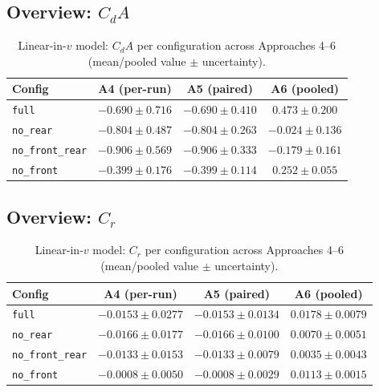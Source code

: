 \documentclass[11pt,a4paper]{article}
\begin{document}
\subsection{Overview: \(C_dA\)}
\begin{table}[h]
  \centering
  \small
  \caption{Linear-in-\(v\) model: \(C_dA\) per configuration across Approaches 4--6 (mean/pooled value $\pm$ uncertainty).}
  \label{tab:linear-cda}
  \begin{tabular}{lccc}
    \toprule
    Config & A4 (per-run) & A5 (paired) & A6 (pooled) \\
    \midrule
    \texttt{full} & $-0.690 \pm 0.716$ & $-0.690 \pm 0.410$ & $0.473 \pm 0.200$ \\
    \texttt{no\_rear} & $-0.804 \pm 0.487$ & $-0.804 \pm 0.263$ & $-0.024 \pm 0.136$ \\
    \texttt{no\_front\_rear} & $-0.906 \pm 0.569$ & $-0.906 \pm 0.333$ & $-0.179 \pm 0.161$ \\
    \texttt{no\_front} & $-0.399 \pm 0.176$ & $-0.399 \pm 0.114$ & $0.252 \pm 0.055$ \\
    \bottomrule
  \end{tabular}
\end{table}

\subsection{Overview: \(C_r\)}
\begin{table}[h]
  \centering
  \small
  \caption{Linear-in-\(v\) model: \(C_r\) per configuration across Approaches 4--6 (mean/pooled value $\pm$ uncertainty).}
  \label{tab:linear-cr}
  \begin{tabular}{lccc}
    \toprule
    Config & A4 (per-run) & A5 (paired) & A6 (pooled) \\
    \midrule
    \texttt{full} & $-0.0153 \pm 0.0277$ & $-0.0153 \pm 0.0134$ & $0.0178 \pm 0.0079$ \\
    \texttt{no\_rear} & $-0.0166 \pm 0.0177$ & $-0.0166 \pm 0.0100$ & $0.0070 \pm 0.0051$ \\
    \texttt{no\_front\_rear} & $-0.0133 \pm 0.0153$ & $-0.0133 \pm 0.0079$ & $0.0035 \pm 0.0043$ \\
    \texttt{no\_front} & $-0.0008 \pm 0.0050$ & $-0.0008 \pm 0.0029$ & $0.0113 \pm 0.0015$ \\
    \bottomrule
  \end{tabular}
\end{table}
\end{document}
